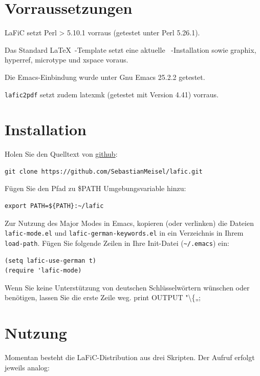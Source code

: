 \documentclass{scrartcl}
\begin{document}
\section{Vorraussetzungen}

LaFiC setzt Perl > 5.10.1 vorraus (getestet unter Perl 5.26.1).

Das Standard \LaTeX\ -Template setzt eine aktuelle
\XeLaTeX\ -Installation sowie graphix, hyperref, microtype und
xspace voraus.

Die Emacs-Einbindung wurde unter Gnu Emacs 25.2.2 getestet.

\texttt{lafic2pdf} setzt zudem latexmk (getestet mit Version 4.41) vorraus.

\section{Installation}
\label{Installation}

Holen Sie den Quelltext von \href{https://github.com}{github}:

\begin{verbatim}
git clone https://github.com/SebastianMeisel/lafic.git
\end{verbatim}


Fügen Sie den Pfad zu \$PATH Umgebungsvariable hinzu:

\begin{verbatim}
export PATH=${PATH}:~/lafic
\end{verbatim}


Zur Nutzung des Major Modes in Emacs, kopieren (oder
verlinken) die Dateien \texttt{lafic-mode.el} und
\texttt{lafic-german-keywords.el} in ein Verzeichnis in Ihrem
\texttt{load-path}. Fügen Sie folgende Zeilen in Ihre Init-Datei
(\texttt{\textasciitilde /.emacs}) ein:

\begin{verbatim}
(setq lafic-use-german t)
(require 'lafic-mode)
\end{verbatim}


Wenn Sie keine Unterstützung von deutschen Schlüsselwörtern
wünschen oder benötigen, lassen Sie die erste Zeile weg.
	print OUTPUT "\textbackslash \{„;

\section{Nutzung}

Momentan besteht die LaFiC-Distribution aus drei
Skripten. Der Aufruf erfolgt jeweils analog:
\end{document}
